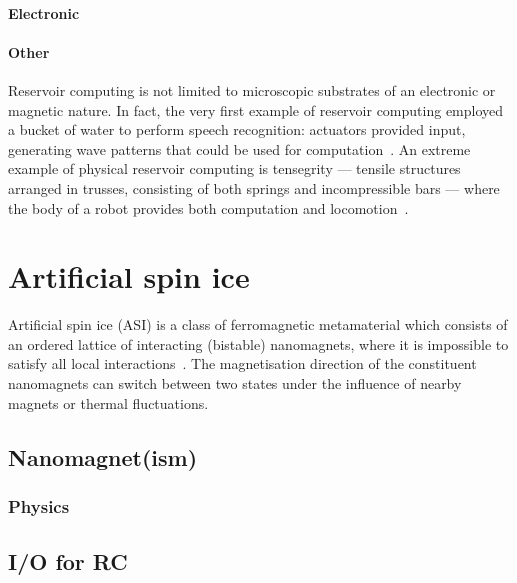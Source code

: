 \paragraph{Electronic}
\paragraph{Other}
Reservoir computing is not limited to microscopic substrates of an electronic or magnetic nature.
In fact, the very first example of reservoir computing employed a bucket of water to perform speech recognition: actuators provided input, generating wave patterns that could be used for computation~\cite{PatternRecognition_Bucket}.
An extreme example of physical reservoir computing is tensegrity --- tensile structures arranged in trusses, consisting of both springs and incompressible bars --- where the body of a robot provides both computation and locomotion~\cite{RC_Tensegrity}.

\section{Artificial spin ice}\label{sec:1:ASI} %
Artificial spin ice (ASI) is a class of ferromagnetic metamaterial which consists of an ordered lattice of interacting (bistable) nanomagnets, where it is impossible to satisfy all local interactions~\cite{RC_ASI}. %
The magnetisation direction of the constituent nanomagnets can switch between two states under the influence of nearby magnets or thermal fluctuations.

\subsection{Nanomagnet(ism)}
\subsubsection{Physics} %
\subsection{I/O for RC}\label{sec:1:ASI_IO}
